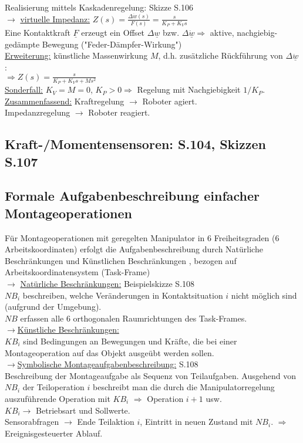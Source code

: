 \documentclass[a4paper,landscape,6pt]{article}
\newcommand{\ul}[1]{\underline{#1}}
\begin{document}
\begin{multicols}{3}
Realisierung mittels Kaskadenregelung: Skizze S.106\\
$\rightarrow$ \ul{virtuelle Impedanz:} $Z(s) = \frac{\Delta \dot w(s)}{F(s)} = \frac{s}{K_P + K_V s}$\\
Eine Kontaktkraft $\ul F$ erzeugt ein Offset $\Delta \ul w$ bzw. $\Delta \dot{\ul w} \Rightarrow$ aktive, nachgiebig-gedämpte Bewegung ("Feder-Dämpfer-Wirkung")\\
\ul{Erweiterung:} künstliche Massenwirkung $M$, d.h. zusätzliche Rückführung von $\Delta \ddot{\ul w}$:\\
$\Rightarrow Z(s) = \frac{s}{K_P + K_V s + M s^2}$\\
\ul{Sonderfall:} $K_V = M = 0$, $K_P > 0 \Rightarrow$ Regelung mit Nachgiebigkeit $1 / K_P$.\\

\ul{Zusammenfassend:} Kraftregelung $\rightarrow$ Roboter agiert.\\
Impedanzregelung $\rightarrow$ Roboter reagiert.
\subsection*{Kraft-/Momentensensoren: S.104, Skizzen S.107}
\subsection*{Formale Aufgabenbeschreibung einfacher Montageoperationen}
Für Montageoperationen mit geregelten Manipulator in 6 Freiheitsgraden (6 Arbeitskoordinaten) erfolgt die Aufgabenbeschreibung durch Natürliche Beschränkungen und Künstlichen Beschränkungen , bezogen auf Arbeitskoordinatensystem (Task-Frame)\\

$\rightarrow$ \ul{Natürliche Beschränkungen:} Beispielskizze S.108\\
$NB_i$ beschreiben, welche Veränderungen in Kontaktsituation $i$ nicht möglich sind (aufgrund der Umgebung).\\
$NB$ erfassen alle 6 orthogonalen Raumrichtungen des Task-Frames.\\

$\rightarrow$\ul{Künstliche Beschränkungen:}\\
$KB_i$ sind Bedingungen an Bewegungen und Kräfte, die bei einer Montageoperation auf das Objekt ausgeübt werden sollen.\\

$\rightarrow$\ul{Symbolische Montageaufgabenbeschreibung:} S.108\\
Beschreibung der Montageaufgabe als Sequenz von Teilaufgaben. Ausgehend von $NB_i$ der Teiloperation $i$ beschreibt man die durch die Manipulatorregelung auszuführende Operation mit $KB_i$ $\Rightarrow$ Operation $i+1$ usw.\\
$KB_i \rightarrow$ Betriebsart und Sollwerte.\\
Sensorabfragen $\rightarrow$ Ende Teilaktion $i$, Eintritt in neuen Zustand mit $NB_i$. $\Rightarrow$ Ereignisgesteuerter Ablauf.

\end{multicols}
\end{document}
